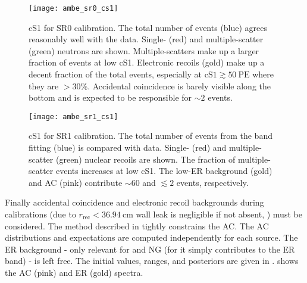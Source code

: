 \begin{figure}
\centering
\texttt{[image: ambe\_sr0\_cs1]}
\caption{cS1 for SR0 \ambe calibration.  The total number of events (blue) agrees reasonably well with the data.  Single- (red) and
multiple-scatter (green) neutrons are shown.  Multiple-scatters make up a larger fraction of events
at low cS1.  Electronic recoils (gold) make up a decent fraction of the total events, especially at $\mathrm{cS1} \gtrsim 50\ \mathrm{PE}$
where they are $> 30\%$.  Accidental coincidence is barely visible along the bottom and is expected to be responsible for ${\sim}2$
events.}
\label{fig:er_nr_calibrations_results_ambe_sr0_cs1}
\end{figure}

\begin{figure}
\centering
\texttt{[image: ambe\_sr1\_cs1]}
\caption{cS1 for SR1 \ambe calibration.  The total number of events from the band fitting (blue) is compared with data.  Single- (red)
and multiple-scatter (green) nuclear recoils are shown.  The fraction of multiple-scatter events increases at low cS1.  The low-ER
background (gold) and AC (pink) contribute ${\sim}60$ and $\lesssim 2$ events, respectively.}
\label{fig:er_nr_calibrations_results_ambe_sr1_cs1}
\end{figure}

Finally accidental coincidence and electronic recoil backgrounds during calibrations (due to
$r_{\mathrm{rec}} < 36.94\ \mathrm{cm}$ wall leak is negligible if not absent,
) must be considered.  The method
described in  tightly constrains the AC.  The AC
distributions and expectations are computed independently for each source.  The ER background - only relevant for \ambe and NG
(for  it simply contributes to the ER band) - is left free.  The initial values, ranges, and posteriors are given in
.   shows the AC (pink) and ER
(gold) spectra.

